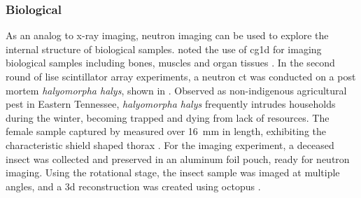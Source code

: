 \documentclass[../../../../main.tex]{subfiles}%
\begin{document}
%
    \subsubsection*{Biological}%
    \label{sec:chapter-3:beamline-testing:imaging-targets:biological}%
    As an analog to \gls{x-ray} imaging, neutron imaging can be used to explore the internal structure of biological samples.
    \citeauthor*{Bilheux_2014} noted the use of \gls{cg1d} for imaging biological samples including bones, muscles and organ tissues \cite{Bilheux_2014}.
    In the second round of \gls{lise} scintillator array experiments, a neutron \gls{ct} was conducted on a post mortem \textit{halyomorpha halys}, shown in .
    Observed as non-indigenous agricultural pest in Eastern Tennessee, \textit{halyomorpha halys} frequently intrudes households during the winter, becoming trapped and dying from lack of resources.
    The female sample captured by \citeauthor*{Jones_2009} measured over \SI{16}{\milli\meter} in length, exhibiting the characteristic shield shaped thorax \cite{Jones_2009}.
    For the imaging experiment, a deceased insect was collected and preserved in an aluminum foil pouch, ready for neutron imaging.
    Using the rotational stage, the insect sample was imaged at multiple angles, and a \gls{3d} reconstruction was created using \gls{octopus} \cite{Lukosi_2017}.
\end{document}
